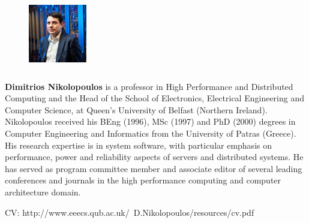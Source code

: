 \documentclass{article}
\begin{document}
  \begin{figure} 
    \includegraphics[width=1in,height=1.25in,clip,keepaspectratio]{pictures/dimitrious.jpg}
  \end{figure}\par
  \textbf{Dimitrios Nikolopoulos} is a professor in High Performance and Distributed Computing and the Head of the School of Electronics, Electrical Engineering and Computer Science, at Queen's University of Belfast (Northern Ireland). Nikolopoulos received his BEng (1996), MSc (1997) and PhD (2000) degrees in Computer Engineering and Informatics from the University of Patras (Greece). His research expertise is in system software, with particular emphasis on performance, power and reliability aspects of servers and distributed systems. He has served as program committee member and associate editor of several leading conferences and journals in the high performance computing and computer architecture domain. 
  
  CV: http://www.eeecs.qub.ac.uk/~D.Nikolopoulos/resources/cv.pdf
  \par
\end{document}
